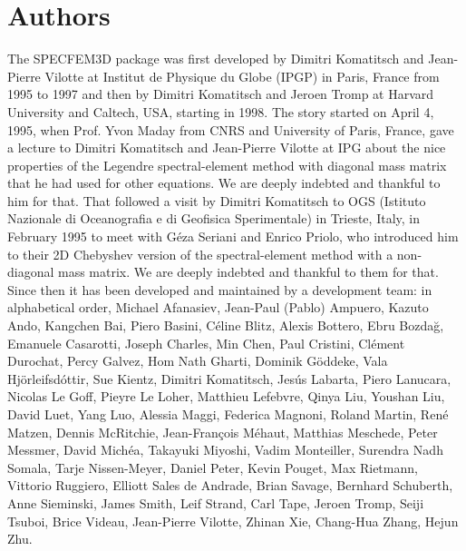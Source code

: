 \section*{Authors}

\noindent The SPECFEM3D package was first developed by Dimitri
Komatitsch and Jean-Pierre Vilotte at Institut de Physique du Globe
(IPGP) in Paris, France from 1995 to 1997 and then by Dimitri Komatitsch
and Jeroen Tromp at Harvard University and Caltech, USA, starting in 1998.
The story started on April 4, 1995, when Prof. Yvon Maday from CNRS and University of Paris, France, gave a lecture to
Dimitri Komatitsch and Jean-Pierre Vilotte at IPG about the nice properties of the Legendre spectral-element method with diagonal mass matrix that he had used for
other equations. We are deeply indebted and thankful to him for that.
That followed a visit by Dimitri Komatitsch to OGS (Istituto Nazionale di Oceanografia e di Geofisica Sperimentale) in Trieste, Italy, in February 1995
to meet with G\'eza Seriani and Enrico Priolo, who introduced him to their 2D Chebyshev version of the spectral-element method with a non-diagonal mass matrix.
We are deeply indebted and thankful to them for that.\\

Since then it has been developed and maintained by a development team: in alphabetical order,
Michael Afanasiev,
Jean-Paul (Pablo) Ampuero,
Kazuto Ando,
Kangchen Bai,
Piero Basini,
C\'eline Blitz,
Alexis Bottero,
Ebru Bozda\u{g},
Emanuele Casarotti,
Joseph Charles,
Min Chen,
Paul Cristini,
Cl\'ement Durochat,
Percy Galvez,
Hom Nath Gharti,
Dominik G\"oddeke,
Vala Hj\"orleifsd\'ottir,
Sue Kientz,
Dimitri Komatitsch,
Jes\'us Labarta,
Piero Lanucara,
Nicolas Le Goff,
Pieyre Le Loher,
Matthieu Lefebvre,
Qinya Liu,
Youshan Liu,
David Luet,
Yang Luo,
Alessia Maggi,
Federica Magnoni,
Roland Martin,
Ren\'e Matzen,
Dennis McRitchie,
Jean-Fran\c{c}ois M\'ehaut,
Matthias Meschede,
Peter Messmer,
David Mich\'ea,
Takayuki Miyoshi,
Vadim Monteiller,
Surendra Nadh Somala,
Tarje Nissen-Meyer,
Daniel Peter,
Kevin Pouget,
Max Rietmann,
Vittorio Ruggiero,
Elliott Sales de Andrade,
Brian Savage,
Bernhard Schuberth,
Anne Sieminski,
James Smith,
Leif Strand,
Carl Tape,
Jeroen Tromp,
Seiji Tsuboi,
Brice Videau,
Jean-Pierre Vilotte,
Zhinan Xie,
Chang-Hua Zhang,
Hejun Zhu.\\


